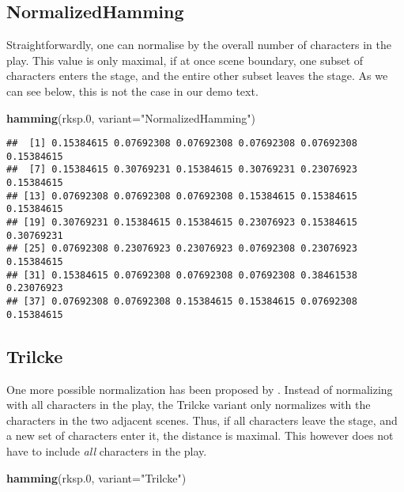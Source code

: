 \documentclass[]{book}
\newenvironment{Shaded}{\begin{snugshade}}{\end{snugshade}}
\newcommand{\DataTypeTok}[1]{\textcolor[rgb]{0.13,0.29,0.53}{#1}}
\newcommand{\FloatTok}[1]{\textcolor[rgb]{0.00,0.00,0.81}{#1}}
\newcommand{\KeywordTok}[1]{\textcolor[rgb]{0.13,0.29,0.53}{\textbf{#1}}}
\newcommand{\NormalTok}[1]{#1}
\newcommand{\StringTok}[1]{\textcolor[rgb]{0.31,0.60,0.02}{#1}}
\begin{document}
\hypertarget{normalizedhamming}{%
\subsection{NormalizedHamming}\label{normalizedhamming}}

Straightforwardly, one can normalise by the overall number of characters in the play. This value is only maximal, if at once scene boundary, one subset of characters enters the stage, and the entire other subset leaves the stage. As we can see below, this is not the case in our demo text.

\begin{Shaded}
\begin{Highlighting}[]
\KeywordTok{hamming}\NormalTok{(rksp}\FloatTok{.0}\NormalTok{, }\DataTypeTok{variant=}\StringTok{"NormalizedHamming"}\NormalTok{)}
\end{Highlighting}
\end{Shaded}

\begin{verbatim}
##  [1] 0.15384615 0.07692308 0.07692308 0.07692308 0.07692308 0.15384615
##  [7] 0.15384615 0.30769231 0.15384615 0.30769231 0.23076923 0.15384615
## [13] 0.07692308 0.07692308 0.07692308 0.15384615 0.15384615 0.15384615
## [19] 0.30769231 0.15384615 0.15384615 0.23076923 0.15384615 0.30769231
## [25] 0.07692308 0.23076923 0.23076923 0.07692308 0.23076923 0.15384615
## [31] 0.15384615 0.07692308 0.07692308 0.07692308 0.38461538 0.23076923
## [37] 0.07692308 0.07692308 0.15384615 0.15384615 0.07692308 0.15384615
\end{verbatim}

\hypertarget{trilcke}{%
\subsection{Trilcke}\label{trilcke}}

One more possible normalization has been proposed by \citet{Trilcke:2017ab}. Instead of normalizing with all characters in the play, the Trilcke variant only normalizes with the characters in the two adjacent scenes. Thus, if all characters leave the stage, and a new set of characters enter it, the distance is maximal. This however does not have to include \emph{all} characters in the play.

\begin{Shaded}
\begin{Highlighting}[]
\KeywordTok{hamming}\NormalTok{(rksp}\FloatTok{.0}\NormalTok{, }\DataTypeTok{variant=}\StringTok{"Trilcke"}\NormalTok{)}
\end{Highlighting}
\end{Shaded}
\end{document}
